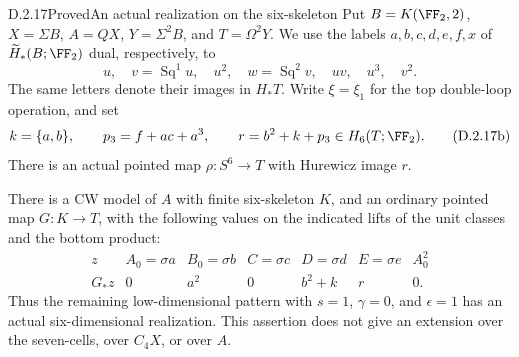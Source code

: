 \begin{claim}{D.2.17}{Proved}{An actual realization on the six-skeleton}
Put $B=K(\FF_2,2)$, $X=\Sigma B$, $A=QX$, $Y=\Sigma^2B$, and
$T=\Omega^2Y$. We use the labels $a,b,c,d,e,f,x$ of
$\widetilde H_*(B;\FF_2)$ dual, respectively, to
\[
 u,\quad v=\operatorname{Sq}^1u,\quad u^2,\quad
 w=\operatorname{Sq}^2v,\quad uv,\quad u^3,\quad v^2.
 \tag{D.2.17a}
\]
The same letters denote their images in $H_*T$. Write
$\xi=\xi_1$ for the top double-loop operation, and set
\[
 k=\{a,b\},\qquad p_3=f+ac+a^3,\qquad
 r=b^2+k+p_3\in H_6(T;\FF_2).
 \tag{D.2.17b}
\]
There is an actual pointed map $\rho:S^6\to T$ with Hurewicz
image $r$.

There is a CW model of $A$ with finite six-skeleton $K$, and an
ordinary pointed map $G:K\to T$, with the following values on
the indicated lifts of the unit classes and the bottom product:
\[
\begin{array}{c|rrrrrr}
 z&A_0=\sigma a&B_0=\sigma b&C=\sigma c&D=\sigma d&E=\sigma e&A_0^2\\
 \hline
 G_*z&0&a^2&0&b^2+k&r&0.
\end{array}
 \tag{D.2.17c}
\]
Thus the remaining low-dimensional pattern with $s=1$, $\gamma=0$,
and $\epsilon=1$ has an actual six-dimensional realization.
This assertion does not give an extension over the seven-cells,
over $C_4X$, or over $A$.
\end{claim}
